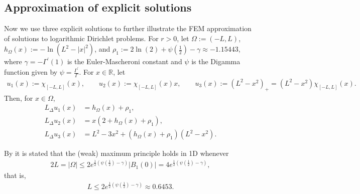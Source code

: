 \documentclass[10 pt]{article}
\numberwithin{equation}{section}
\def\R{\mathbb{R}}
\begin{document}
\subsection{Approximation of explicit solutions}

Now we use three explicit solutions to further illustrate the FEM approximation of solutions to logarithmic Dirichlet problems. For $r>0$, let  $\Omega:=(-L,L)$, $h_\Omega(x):=-\ln(L^2-|x|^2)$, and $\rho_1:=2 \ln (2)+\psi\left(\frac{1}{2}\right)-\gamma\approx -1.15443$, where $\gamma=-\Gamma^{\prime}(1)$ is the Euler-Mascheroni constant and $\psi$ is the Digamma function given by $\psi=\frac{\Gamma^{\prime}}{\Gamma}$.  For $x\in\R$, let 
\begin{align*}
u_1(x):=\chi_{[-L,L]}(x), \qquad
u_2(x):=\chi_{[-L,L]}(x) x, \qquad
u_3(x):=(L^2-x^2)_+=(L^2-x^2)\chi_{[-L,L]}(x).
\end{align*}
Then, for $x\in \Omega$,
\begin{align*}
    L_\Delta u_1(x)&=h_\Omega(x)+\rho_1,\\
    L_\Delta u_2(x)&=x(2+h_\Omega(x)+\rho_1),\\
    L_\Delta u_3(x)&=L^2-3x^2+(h_\Omega(x)+\rho_1)(L^2-x^2).
\end{align*}

By \cite[Corollary 1.9]{CW19} it is stated that the (weak) maximum principle holds in 1D whenever 
\begin{align*}
    2L=|\Omega|\leq 2 e^{\frac{1}{2}(\psi(\frac{1}{2})-\gamma)}|B_1(0)|=4e^{\frac{1}{2}(\psi(\frac{1}{2})-\gamma)},
    \end{align*}
    that is,
    \begin{align*}
        L\leq 2 e^{\frac{1}{2}(\psi(\frac{1}{2})-\gamma)}\approx 0.6453.
\end{align*}
\end{document}
